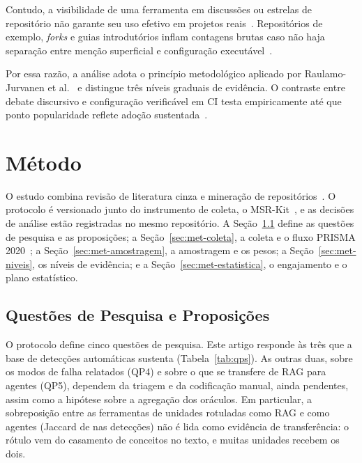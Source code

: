 \documentclass[sigconf]{acmart}
\begin{document}
Contudo, a visibilidade de uma ferramenta em discussões ou estrelas de repositório não garante seu uso efetivo em projetos reais~\cite{borges2018star,kalliamvakou2014promises}. Repositórios de exemplo, \textit{forks} e guias introdutórios inflam contagens brutas caso não haja separação entre menção superficial e configuração executável~\cite{kalliamvakou2014promises,ralph2020standards}.

Por essa razão, a análise adota o princípio metodológico aplicado por Raulamo-Jurvanen et al.~\cite{raulamo2017choosing} e distingue três níveis graduais de evidência. O contraste entre debate discursivo e configuração verificável em CI testa empiricamente até que ponto popularidade reflete adoção sustentada~\cite{borges2018star,kalliamvakou2014promises}.

\section{Método}
\label{sec:metodo}

O estudo combina revisão de literatura cinza e mineração de repositórios~\cite{garousi2019guidelines,kalliamvakou2014promises}. O protocolo é versionado junto do instrumento de coleta, o MSR-Kit~\cite{msrkit2027}, e as decisões de análise estão registradas no mesmo repositório. A Seção~\ref{sec:met-qps} define as questões de pesquisa e as proposições; a Seção~\ref{sec:met-coleta}, a coleta e o fluxo PRISMA 2020~\cite{page2021prisma}; a Seção~\ref{sec:met-amostragem}, a amostragem e os pesos; a Seção~\ref{sec:met-niveis}, os níveis de evidência; e a Seção~\ref{sec:met-estatistica}, o engajamento e o plano estatístico.

\subsection{Questões de Pesquisa e Proposições}
\label{sec:met-qps}

O protocolo define cinco questões de pesquisa. Este artigo responde às três que a base de detecções automáticas sustenta (Tabela~\ref{tab:qps}). As outras duas, sobre os modos de falha relatados (QP4) e sobre o que se transfere de RAG para agentes (QP5), dependem da triagem e da codificação manual, ainda pendentes, assim como a hipótese sobre a agregação dos oráculos. Em particular, a sobreposição entre as ferramentas de unidades rotuladas como RAG e como agentes (Jaccard de \ResJaccardDeteccoes{} nas detecções) não é lida como evidência de transferência: o rótulo vem do casamento de conceitos no texto, e muitas unidades recebem os dois.
\end{document}
